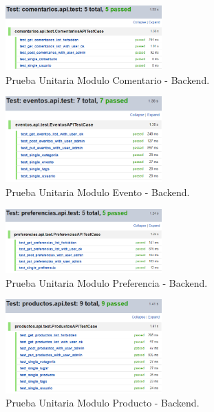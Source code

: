 \documentclass[12pt,letterpaper,openany]{book}
\begin{document}
\begin{figure}[H]
\begin{center}
\includegraphics[width=6cm]{./imagenes/Test/Backend/Test__comentarios_api_test}
\caption{Prueba Unitaria Modulo Comentario - Backend.}
\end{center}
\end{figure}

\begin{figure}[H]
\begin{center}
\includegraphics[width=6cm]{./imagenes/Test/Backend/Test__eventos_api_test}
\caption{Prueba Unitaria Modulo Evento - Backend.}
\end{center}
\end{figure}

\begin{figure}[H]
\begin{center}
\includegraphics[width=6cm]{./imagenes/Test/Backend/Test__preferencias_api_test}
\caption{Prueba Unitaria Modulo Preferencia - Backend.}
\end{center}
\end{figure}

\begin{figure}[H]
\begin{center}
\includegraphics[width=6cm]{./imagenes/Test/Backend/Test__productos_api_test}
\caption{Prueba Unitaria Modulo Producto - Backend.}
\end{center}
\end{figure}
\end{document}
